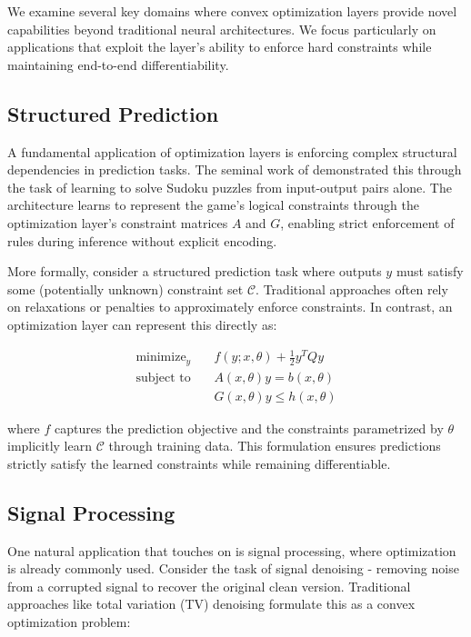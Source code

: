 \documentclass{article}
\begin{document}
We examine several key domains where convex optimization layers provide novel capabilities beyond traditional neural architectures. We focus particularly on applications that exploit the layer's ability to enforce hard constraints while maintaining end-to-end differentiability.

\subsection{Structured Prediction}

A fundamental application of optimization layers is enforcing complex structural dependencies in prediction tasks. The seminal work of \citet{optnet} demonstrated this through the task of learning to solve Sudoku puzzles from input-output pairs alone. The architecture learns to represent the game's logical constraints through the optimization layer's constraint matrices $A$ and $G$, enabling strict enforcement of rules during inference without explicit encoding.

More formally, consider a structured prediction task where outputs $y$ must satisfy some (potentially unknown) constraint set $\mathcal{C}$. Traditional approaches often rely on relaxations or penalties to approximately enforce constraints. In contrast, an optimization layer can represent this directly as:

\begin{equation}
\begin{aligned}
\text{minimize}_y \quad & f(y; x, \theta) + \frac{1}{2}y^TQy \\
\text{subject to} \quad & A(x,\theta)y = b(x,\theta) \\
& G(x,\theta)y \leq h(x,\theta)
\end{aligned}
\end{equation}

where $f$ captures the prediction objective and the constraints parametrized by $\theta$ implicitly learn $\mathcal{C}$ through training data. This formulation ensures predictions strictly satisfy the learned constraints while remaining differentiable.

\subsection{Signal Processing}

One natural application that \citet{optnet} touches on is signal processing, where optimization is already commonly used. Consider the task of signal denoising - removing noise from a corrupted signal to recover the original clean version. Traditional approaches like total variation (TV) denoising formulate this as a convex optimization problem:
\end{document}
